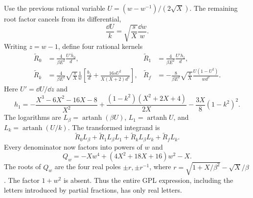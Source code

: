 Use the previous rational variable
$U=(w-w^{-1})/(2\sqrt X)$.  The remaining root factor cancels from
its differential,
\begin{equation}
 \frac{\dd U}{k}=\sqrt{\frac sX}\frac{\dd w}{w}.
\end{equation}
Writing $z=w-1$, define four rational kernels
\begin{align}
 \widetilde R_0&=\frac4{\beta E^2}\frac{U'\overline h_0}{d},&
 \widetilde R_1&=\frac4{\beta E^2}\frac{U'h_1}{d},\\
 \widetilde R_k&=\frac4{\beta E^2}\sqrt{\frac sX}\frac1w
 \left[\frac{b_1}d+\frac{16sU^2}{X(X+2)d^2}\right],&
 \widetilde R_f&=-\frac8{\beta E^2}\sqrt{\frac sX}
 \frac{U(1-U^2)}{wd^2}.
\end{align}
Here $U'=\dd U/\dd z$ and
\begin{equation}
 h_1=-\frac{X^3-6X^2-16X-8}{X^2}
 +\frac{(1-k^2)(X^2+2X+4)}{2X}
 -\frac{3X}{8}(1-k^2)^2.
\end{equation}
The logarithms are $L_\beta=\operatorname{artanh}(\beta U)$,
$L_1=\operatorname{artanh}U$, and $L_k=\operatorname{artanh}(U/k)$.
The transformed integrand is
\begin{equation}
 \widetilde R_0 L_\beta+\widetilde R_1L_\beta L_1
 +\widetilde R_kL_\beta L_k+\widetilde R_f L_k.
\end{equation}
Every denominator now factors into powers of $w$ and
\begin{equation}
 Q_w=-Xw^4+(4X^2+18X+16)w^2-X.
\end{equation}
The roots of $Q_w$ are the four real poles
$\pm r,\pm r^{-1}$, where
$r=\sqrt{1+X/\beta^2}-\sqrt X/\beta$.
The factor $1+w^2$ is absent.
Thus the entire GPL expression, including the letters introduced by
partial fractions, has only real letters.
